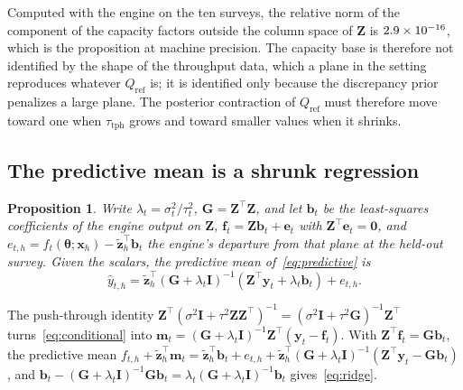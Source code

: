 \documentclass[journal]{IEEEtran}
\newtheorem{proposition}{Proposition}
\begin{document}
Computed with the engine on the ten surveys, the relative norm of the component of the capacity factors outside
the column space of $\mathbf Z$ is $2.9\times 10^{-16}$, which is the proposition at machine precision. The capacity base is
therefore not identified by the shape of the throughput data, which a plane in the setting reproduces whatever
$Q_{\mathrm{ref}}$ is; it is identified only because the discrepancy prior penalizes a large plane. The posterior contraction
of $Q_{\mathrm{ref}}$ must therefore move toward one when $\tau_{\mathrm{tph}}$ grows and toward smaller values when it shrinks.

\subsection{The predictive mean is a shrunk regression}

\begin{proposition}\label{prop:ridge}
Write $\lambda_t=\sigma_t^2/\tau_t^2$, $\mathbf G=\mathbf Z^{\top}\mathbf Z$, and let $\mathbf b_t$ be the least-squares
coefficients of the engine output on $\mathbf Z$, $\mathbf f_t=\mathbf Z\mathbf b_t+\mathbf e_t$ with $\mathbf Z^{\top}\mathbf
e_t=\mathbf 0$, and $e_{t,h}=f_t(\boldsymbol\theta;\mathbf x_h)-\tilde{\mathbf z}_h^{\top}\mathbf b_t$ the engine's departure from that
plane at the held-out survey. Given the scalars, the predictive mean of~\eqref{eq:predictive} is
\begin{equation}
\hat y_{t,h}=\tilde{\mathbf z}_h^{\top}\left(\mathbf G+\lambda_t\mathbf I\right)^{-1}\left(\mathbf Z^{\top}\mathbf y_t+\lambda_t\mathbf b_t\right)+e_{t,h}.
\label{eq:ridge}
\end{equation}
\end{proposition}
\begin{IEEEproof}
The push-through identity $\mathbf Z^{\top}(\sigma^2\mathbf I+\tau^2\mathbf Z\mathbf Z^{\top})^{-1}=(\sigma^2\mathbf
I+\tau^2\mathbf G)^{-1}\mathbf Z^{\top}$ turns~\eqref{eq:conditional} into $\mathbf m_t=(\mathbf G+\lambda_t\mathbf
I)^{-1}\mathbf Z^{\top}(\mathbf y_t-\mathbf f_t)$. With $\mathbf Z^{\top}\mathbf f_t=\mathbf G\mathbf b_t$, the predictive mean
$f_{t,h}+\tilde{\mathbf z}_h^{\top}\mathbf m_t=\tilde{\mathbf z}_h^{\top}\mathbf b_t+e_{t,h}+\tilde{\mathbf z}_h^{\top}(\mathbf G+\lambda_t\mathbf
I)^{-1}(\mathbf Z^{\top}\mathbf y_t-\mathbf G\mathbf b_t)$, and $\mathbf b_t-(\mathbf G+\lambda_t\mathbf I)^{-1}\mathbf
G\mathbf b_t=\lambda_t(\mathbf G+\lambda_t\mathbf I)^{-1}\mathbf b_t$ gives~\eqref{eq:ridge}.
\end{IEEEproof}
\end{document}
